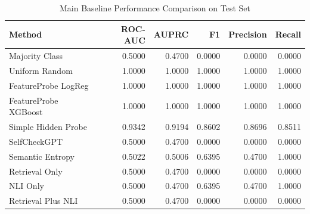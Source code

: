 \begin{table}[htbp]
\caption{Main Baseline Performance Comparison on Test Set}
\begin{center}
\begin{tabular}{lrrrrr}
\toprule
\textbf{Method} & \textbf{ROC-AUC} & \textbf{AUPRC} & \textbf{F1} & \textbf{Precision} & \textbf{Recall} \\
\midrule
Majority Class & 0.5000 & 0.4700 & 0.0000 & 0.0000 & 0.0000 \\
Uniform Random & 1.0000 & 1.0000 & 1.0000 & 1.0000 & 1.0000 \\
FeatureProbe LogReg & 1.0000 & 1.0000 & 1.0000 & 1.0000 & 1.0000 \\
FeatureProbe XGBoost & 1.0000 & 1.0000 & 1.0000 & 1.0000 & 1.0000 \\
Simple Hidden Probe & 0.9342 & 0.9194 & 0.8602 & 0.8696 & 0.8511 \\
SelfCheckGPT & 0.5000 & 0.4700 & 0.0000 & 0.0000 & 0.0000 \\
Semantic Entropy & 0.5022 & 0.5006 & 0.6395 & 0.4700 & 1.0000 \\
Retrieval Only & 0.5000 & 0.4700 & 0.0000 & 0.0000 & 0.0000 \\
NLI Only & 0.5000 & 0.4700 & 0.6395 & 0.4700 & 1.0000 \\
Retrieval Plus NLI & 0.5000 & 0.4700 & 0.0000 & 0.0000 & 0.0000 \\
\bottomrule
\end{tabular}
\label{tab:baselines}
\end{center}
\end{table}